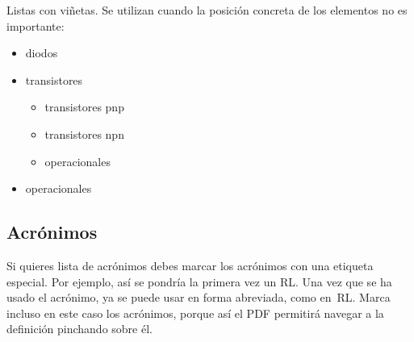Listas con viñetas. Se utilizan cuando la posición concreta de los elementos no es importante:

\begin{itemize}
\item diodos
\item transistores
    \begin{itemize}
    \item transistores pnp
    \item transistores npn
    \item operacionales
    \end{itemize}
\item operacionales
\end{itemize}

\subsection{Acrónimos}

Si quieres lista de acrónimos debes marcar los acrónimos con una etiqueta especial.  Por ejemplo, así se pondría la primera vez un \acrfull{RL}.  Una vez que se ha usado el acrónimo, ya se puede usar en forma abreviada, como en~\acrshort{RL}.  Marca incluso en este caso los acrónimos, porque así el PDF permitirá navegar a la definición pinchando sobre él.
